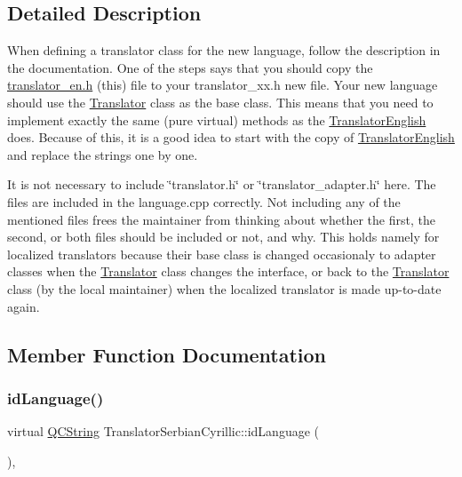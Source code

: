 \subsection{Detailed Description}
When defining a translator class for the new language, follow the description in the documentation. One of the steps says that you should copy the \mbox{\hyperlink{translator__en_8h_source}{translator\+\_\+en.\+h}} (this) file to your translator\+\_\+xx.\+h new file. Your new language should use the \mbox{\hyperlink{class_translator}{Translator}} class as the base class. This means that you need to implement exactly the same (pure virtual) methods as the \mbox{\hyperlink{class_translator_english}{Translator\+English}} does. Because of this, it is a good idea to start with the copy of \mbox{\hyperlink{class_translator_english}{Translator\+English}} and replace the strings one by one.

It is not necessary to include \char`\"{}translator.\+h\char`\"{} or \char`\"{}translator\+\_\+adapter.\+h\char`\"{} here. The files are included in the language.\+cpp correctly. Not including any of the mentioned files frees the maintainer from thinking about whether the first, the second, or both files should be included or not, and why. This holds namely for localized translators because their base class is changed occasionaly to adapter classes when the \mbox{\hyperlink{class_translator}{Translator}} class changes the interface, or back to the \mbox{\hyperlink{class_translator}{Translator}} class (by the local maintainer) when the localized translator is made up-\/to-\/date again. 

\subsection{Member Function Documentation}
\mbox{\label{class_translator_serbian_cyrillic_aeeb4b73fec8f2f8df4df12738893b200}} 
\subsubsection{\texorpdfstring{idLanguage()}{idLanguage()}}
{\footnotesize\ttfamily virtual \mbox{\hyperlink{class_q_c_string}{Q\+C\+String}} Translator\+Serbian\+Cyrillic\+::id\+Language (\begin{DoxyParamCaption}{ }\end{DoxyParamCaption})\hspace{0.3cm}{\ttfamily [inline]}, {\ttfamily [virtual]}}

